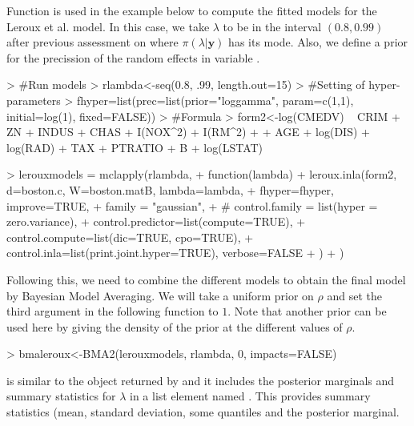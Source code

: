 \documentclass[article]{jss}
\begin{document}
Function  is used in the example below to compute the fitted
models for the Leroux et al. model.  In this case, we take $\lambda$ to be in
the interval $(0.8,0.99)$ after previous assessment on where
$\pi(\lambda|\mathbf{y})$ has its mode. Also, we define a prior for the
precission of the random effects in variable .

\begin{Schunk}
\begin{Sinput}
> #Run models
> rlambda<-seq(0.8, .99, length.out=15)
> #Setting of hyper-parameters
> fhyper=list(prec=list(prior="loggamma", param=c(1,1), initial=log(1), fixed=FALSE))
> #Formula
> form2<-log(CMEDV) ~ CRIM + ZN + INDUS + CHAS + I(NOX^2) + I(RM^2) + 
+     AGE + log(DIS) + log(RAD) + TAX + PTRATIO + B + log(LSTAT)
\end{Sinput}
\end{Schunk}

\begin{Schunk}
\begin{Sinput}
> lerouxmodels = mclapply(rlambda,
+         function(lambda) {
+                 leroux.inla(form2, d=boston.c, W=boston.matB, lambda=lambda,
+                         fhyper=fhyper, improve=TRUE,
+                         family = "gaussian",
+ #   control.family = list(hyper = zero.variance),
+                         control.predictor=list(compute=TRUE),
+                         control.compute=list(dic=TRUE, cpo=TRUE),
+                         control.inla=list(print.joint.hyper=TRUE), verbose=FALSE
+                 )
+         })
\end{Sinput}
\end{Schunk}






Following this, we need to combine the different models to obtain the final
model by Bayesian Model Averaging. We will take a uniform prior on $\rho$ and
set the third argument in the following function to $1$. Note that another
prior can be used here by giving the density of the prior at the different
values of $\rho$.



\begin{Schunk}
\begin{Sinput}
> bmaleroux<-BMA2(lerouxmodels, rlambda, 0, impacts=FALSE)
\end{Sinput}
\end{Schunk}


\noindent
{} is similar to the object returned by  and it
includes the posterior marginals and summary statistics for $\lambda$
in a list element named . This provides summary statistics (mean,
standard deviation, some quantiles and the posterior marginal.
\end{document}
